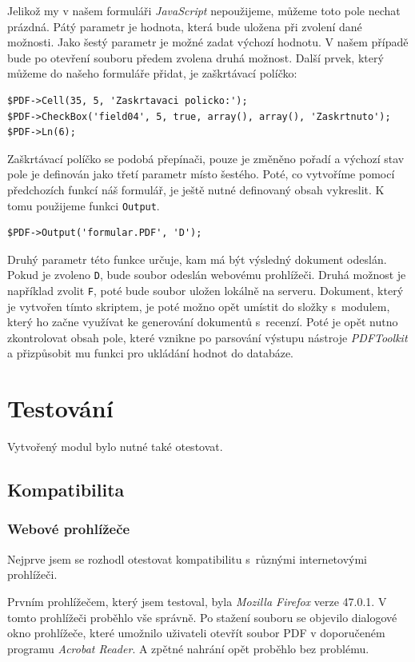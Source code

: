 \documentclass[czech,BP]{thesiskiv}
\begin{document}
Jelikož my v našem formuláři \emph{JavaScript} nepoužijeme, můžeme toto pole nechat prázdná. Pátý parametr je hodnota, která bude uložena při zvolení dané možnosti. Jako šestý parametr je možné zadat výchozí hodnotu. V našem případě bude po otevření souboru předem zvolena druhá možnost. Další prvek, který můžeme do našeho formuláře přidat, je zaškrtávací políčko:
\begin{lstlisting}[firstnumber=25]
$PDF->Cell(35, 5, 'Zaskrtavaci policko:');
$PDF->CheckBox('field04', 5, true, array(), array(), 'Zaskrtnuto');
$PDF->Ln(6);
\end{lstlisting}
Zaškrtávací políčko se podobá přepínači, pouze je změněno pořadí a výchozí stav pole je definován jako třetí parametr místo šestého. Poté, co vytvoříme pomocí předchozích funkcí náš formulář, je ještě nutné definovaný obsah vykreslit. K tomu použijeme funkci \texttt{Output}.
\begin{lstlisting}[firstnumber=28]
$PDF->Output('formular.PDF', 'D');
\end{lstlisting}
Druhý parametr této funkce určuje, kam má být výsledný dokument odeslán. Pokud je zvoleno \texttt{D}, bude soubor odeslán webovému prohlížeči. Druhá možnost je například zvolit \texttt{F}, poté bude soubor uložen lokálně na serveru.
Dokument, který je vytvořen tímto skriptem, je poté možno opět umístit do složky s~modulem, který ho začne využívat ke generování dokumentů s~recenzí. Poté je opět nutno zkontrolovat obsah pole, které vznikne po parsování výstupu nástroje \emph{PDFToolkit} a přizpůsobit mu funkci pro ukládání hodnot do databáze.
\chapter{Testování}
Vytvořený modul bylo nutné také otestovat. 
\section{Kompatibilita}
\subsection{Webové prohlížeče}
Nejprve jsem se rozhodl otestovat kompatibilitu s~různými internetovými prohlížeči. 

Prvním prohlížečem, který jsem testoval, byla \emph{Mozilla Firefox} verze 47.0.1. V tomto prohlížeči proběhlo vše správně. Po stažení souboru se objevilo dialogové okno prohlížeče, které umožnilo uživateli otevřít soubor PDF v doporučeném programu \emph{Acrobat Reader}. A zpětné nahrání opět proběhlo bez problému. 
\end{document}
